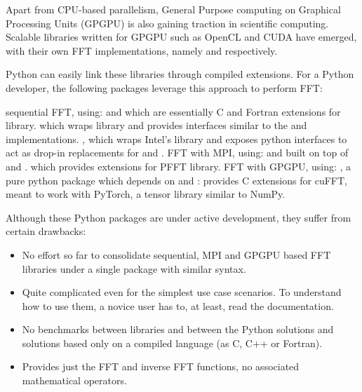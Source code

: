 \documentclass{../jors}
\begin{document}
Apart from CPU-based parallelism, General Purpose computing on Graphical
Processing Units (GPGPU) is also gaining traction in scientific computing.
Scalable libraries written for GPGPU such as OpenCL and CUDA have emerged, with
their own FFT implementations, namely  and 
respectively.

Python can easily link these libraries through compiled extensions. For a Python
developer, the following packages leverage this approach to perform FFT:

\begin{outline}
  \1 sequential FFT, using:
    \2  and  which are essentially
    C and Fortran extensions for  library.
    \2  which wraps  library and provides interfaces similar to
    the  and  implementations.
    \2 , which wraps Intel's  library and exposes python
    interfaces to act as drop-in replacements for  and
    .
  \1 FFT with MPI, using:
    \2  and  built on top of  and
    .
    \2  which provides extensions for
    PFFT library.
  \1 FFT with GPGPU, using:
    \2 , a pure python package which depends on 
    and 
    \2 : provides C extensions for cuFFT, meant to work with
    PyTorch, a tensor library similar to NumPy.
\end{outline}

Although these Python packages are under active development, they suffer from
certain drawbacks:

\begin{itemize}
  \item No effort so far to consolidate sequential, MPI and GPGPU based FFT
  libraries under a single package with similar syntax.

  \item Quite complicated even for the simplest use case scenarios. To
  understand how to use them, a novice user has to, at least, read the
   documentation.

  \item No benchmarks between libraries and between the Python
  solutions and solutions based only on a compiled language (as C, C++ or
  Fortran).

  \item Provides just the FFT and inverse FFT functions, no associated
  mathematical operators.

\end{itemize}
\end{document}
